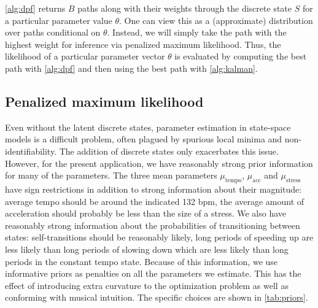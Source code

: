\documentclass[12pt]{article}
\begin{document}
\autoref{alg:dpf} returns $B$ paths along with their weights through
the discrete state $S$ for a 
particular parameter value $\theta$. One
can view this as a (approximate) distribution over paths conditional
on $\theta$. Instead, we will simply take the path with the highest
weight for inference via penalized maximum likelihood. Thus, the
likelihood of a particular parameter vector $\theta$ is evaluated by
computing the best path with \autoref{alg:dpf} and then using the best
path with \autoref{alg:kalman}.

\subsection{Penalized maximum likelihood}
\label{sec:penal-maxim-likel}

Even without the latent discrete states, parameter estimation in
state-space models is a difficult problem, often plagued by spurious
local minima and non-identifiability. The addition of discrete states
only exacerbates this issue. However, for the present application, we
have reasonably strong prior information for many of the
parameters. The three mean parameters $\mu_{\textrm{tempo}}$,
$\mu_{\textrm{acc}}$ and $\mu_{\textrm{stress}}$ have sign
restrictions in addition to strong information about their magnitude:
average tempo should be around the indicated 132 bpm, the average
amount of acceleration should probably be less than the size of a
stress. We also have reasonably strong information about the
probabilities of transitioning between states: self-transitions should
be reasonably likely, long periods of speeding up are less likely than
long periods of slowing down which are less likely than long periods
in the constant tempo state. Because of this information, we use
informative priors as penalties on all the parameters we
estimate. This has the effect of introducing extra curvature to the
optimization problem as well as conforming with musical intuition. The
specific choices are shown in \autoref{tab:priors}. 
\end{document}
